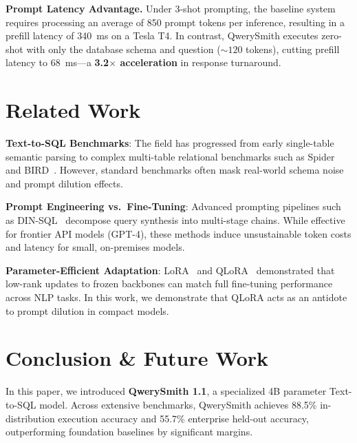 \documentclass[10pt,twocolumn,letterpaper]{article}
\theoremstyle{definition}
\begin{document}
\noindent\textbf{Prompt Latency Advantage.} Under 3-shot prompting, the baseline system requires processing an average of 850 prompt tokens per inference, resulting in a prefill latency of 340~ms on a Tesla T4. In contrast, QwerySmith executes zero-shot with only the database schema and question ($\sim 120$ tokens), cutting prefill latency to 68~ms—a \textbf{3.2$\times$ acceleration} in response turnaround.

\section{Related Work}
\label{sec:related}

\noindent\textbf{Text-to-SQL Benchmarks}: The field has progressed from early single-table semantic parsing to complex multi-table relational benchmarks such as Spider~\cite{yu2018spider} and BIRD~\cite{li2023bird}. However, standard benchmarks often mask real-world schema noise and prompt dilution effects.

\noindent\textbf{Prompt Engineering vs.\ Fine-Tuning}: Advanced prompting pipelines such as DIN-SQL~\cite{pourreza2023din} decompose query synthesis into multi-stage chains. While effective for frontier API models (GPT-4), these methods induce unsustainable token costs and latency for small, on-premises models.

\noindent\textbf{Parameter-Efficient Adaptation}: LoRA~\cite{hu2021lora} and QLoRA~\cite{dettmers2023qlora} demonstrated that low-rank updates to frozen backbones can match full fine-tuning performance across NLP tasks. In this work, we demonstrate that QLoRA acts as an antidote to prompt dilution in compact models.

\section{Conclusion \& Future Work}
\label{sec:conclusion}

In this paper, we introduced \textbf{QwerySmith 1.1}, a specialized 4B parameter Text-to-SQL model. Across extensive benchmarks, QwerySmith achieves 88.5\% in-distribution execution accuracy and 55.7\% enterprise held-out accuracy, outperforming foundation baselines by significant margins.
\end{document}
